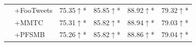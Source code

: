 \begin{tabular}{llcccc}
 & +FooTweets & 75.35\colorbox{mygreen}{$\uparrow$}* & 85.85\colorbox{mygreen}{$\uparrow$}* & 88.92\colorbox{mygreen}{$\uparrow$}* & 79.32\colorbox{mygreen}{$\uparrow$}* \\
 & +MMTC & 75.31\colorbox{mygreen}{$\uparrow$}* & 85.82\colorbox{mygreen}{$\uparrow$}* & 88.94\colorbox{mygreen}{$\uparrow$}* & 79.03\colorbox{mygreen}{$\uparrow$}* \\
 & +PFSMB & 75.26\colorbox{mygreen}{$\uparrow$}* & 85.82\colorbox{mygreen}{$\uparrow$}* & 88.86\colorbox{mygreen}{$\uparrow$}* & 79.04\colorbox{mygreen}{$\uparrow$}* \\
\bottomrule
\end{tabular}
